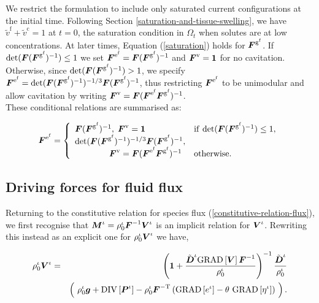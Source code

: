 We restrict the formulation to include only saturated current
configurations at the initial time. Following Section
\ref{saturation-and-tissue-swelling}, we have $\tilde{v}^\mathrm{f} +
\tilde{v}^\mathrm{c} = 1$ at $t = 0$, the saturation condition in
$\Omega_t$ when solutes are at low concentrations. At later times,
Equation (\ref{saturation}) holds for
$\mbox{\boldmath$ F$}^{\mathrm{g}^\mathrm{f}}$. If $\mathrm{det}(\mbox{\boldmath$ F$}(\mbox{\boldmath$ F$} ^
{\mathrm{g}^\mathrm{f}})^{-1}) \le 1$ we set $\mbox{\boldmath$ F$}^{\mathrm{e} ^
  \mathrm{f}} = \mbox{\boldmath$ F$}(\mbox{\boldmath$ F$}^{\mathrm{g}^\mathrm{f}})^{-1}$ and
$\mbox{\boldmath$ F$}^{\mathrm{v}} = {\bf 1}$ for no cavitation. Otherwise, since
$\mathrm{det}(\mbox{\boldmath$ F$}(\mbox{\boldmath$ F$}^{\mathrm{g}^\mathrm{f}})^{-1}) > 1$, we specify
$\mbox{\boldmath$ F$}^{\mathrm{e}^\mathrm{f}} = \mathrm{det}(\mbox{\boldmath$ F$}(\mbox{\boldmath$ F$}^{\mathrm{g} ^
  \mathrm{f}})^{-1})^{-1/3}\mbox{\boldmath$ F$} (\mbox{\boldmath$ F$}^{\mathrm{g}^\mathrm{f}})^{-1}$,
thus restricting $\mbox{\boldmath$ F$}^{\mathrm{e}^\mathrm{f}}$ to be unimodular and
allow cavitation by writing $\mbox{\boldmath$ F$}^{\mathrm{v}} =
\mbox{\boldmath$ F$}(\mbox{\boldmath$ F$}^{\mathrm{e}^\mathrm{f}} \mbox{\boldmath$ F$}^{\mathrm{g}^\mathrm{f}}) ^
   {-1}$.\\ %


These conditional relations are summarised as:

\begin{equation}
\mbox{\boldmath$ F$}^{\mathrm{e}^\mathrm{f}} = \left\{ \begin{array}{ll}
  \mbox{\boldmath$ F$}(\mbox{\boldmath$ F$}^{\mathrm{g}^\mathrm{f}})^{-1},\; \mbox{\boldmath$ F$}^{\mathrm{v}} = {\bf 1}&
  \mathrm{if}\ \mathrm{det}(\mbox{\boldmath$ F$}(\mbox{\boldmath$ F$}^{\mathrm{g}^\mathrm{f}})^{-1}) \le
  1,\\ \mathrm{det}(\mbox{\boldmath$ F$}(\mbox{\boldmath$ F$}^{\mathrm{g}^\mathrm{f}})^{-1})^{-1/3}
  \mbox{\boldmath$ F$}(\mbox{\boldmath$ F$}^{\mathrm{g}^\mathrm{f}})^{-1}, & \\ \qquad\qquad
  \mbox{\boldmath$ F$}^{\mathrm{v}} =
  \mbox{\boldmath$ F$}(\mbox{\boldmath$ F$}^{\mathrm{e}^\mathrm{f}}\mbox{\boldmath$ F$}^{\mathrm{g}^\mathrm{f}})^{-1} &
  \mathrm{otherwise.}
\end{array}\right.
\label{cavitation}
\end{equation}

\subsection{Driving forces for fluid flux}
\label{fluid-flux-constitutive-relationships}

Returning to the constitutive relation for species flux
(\ref{constitutive-relation-flux}), we first recognise that $\mbox{\boldmath$ M$}^\iota
= \rho_0^\iota\mbox{\boldmath$ F$}^{-1}\mbox{\boldmath$ V$}^\iota$ is an implicit relation for
$\mbox{\boldmath$ V$}^\iota$. Rewriting this instead as an explicit one for
$\rho^\iota_0\mbox{\boldmath$ V$}^\iota$ we have,

\begin{eqnarray}
\rho^\iota_0\mbox{\boldmath$ V$}^\iota & = &\left({\bf 1} +
\frac{\tilde{\mbox{\boldmath$ D$}}^\iota\mathrm{GRAD}\left[\mbox{\boldmath$ V$}\right]\mbox{\boldmath$ F$}^{-1}}
     {\rho^\iota_0}\right)^{-1}
     \frac{\tilde{\mbox{\boldmath$ D$}}^\iota}{\rho^\iota_0}\nonumber\\ & &\left(
     \ \rho_0^\iota\mbox{\boldmath$ g$} + \mathrm{DIV}\left[\mbox{\boldmath$ P$}^\iota\right] -
     \rho^\iota_0\mbox{\boldmath$ F$}^{-\mathrm{T}}\left(\mathrm{GRAD}
     \left[e^\iota\right] -
     \theta\ \mathrm{GRAD}\left[\eta^\iota\right]\right)\ \right).
     \nonumber
\end{eqnarray}

